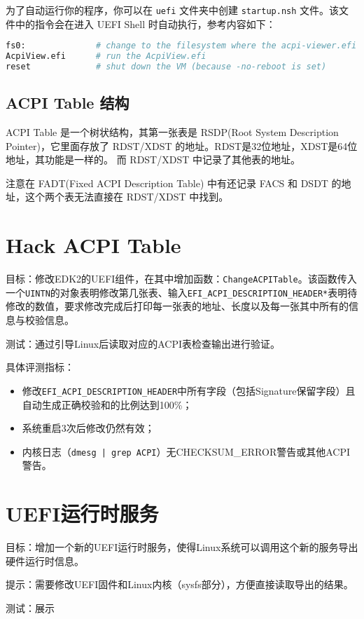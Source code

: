 为了自动运行你的程序，你可以在 \texttt{uefi} 文件夹中创建 \texttt{startup.nsh} 文件。该文件中的指令会在进入 UEFI Shell 时自动执行，参考内容如下：

\begin{lstlisting}[language=bash]
fs0:              # change to the filesystem where the acpi-viewer.efi is located
AcpiView.efi      # run the AcpiView.efi
reset             # shut down the VM (because -no-reboot is set)
\end{lstlisting}

\subsection{ACPI Table 结构}

ACPI Table 是一个树状结构，其第一张表是 RSDP(Root System Description Pointer)，它里面存放了 RDST/XDST 的地址。RDST是32位地址，XDST是64位地址，其功能是一样的。
而 RDST/XDST 中记录了其他表的地址。

注意在 FADT(Fixed ACPI Description Table) 中有还记录 FACS 和 DSDT 的地址，这个两个表无法直接在 RDST/XDST 中找到。

\section{Hack ACPI Table}
目标：修改EDK2的UEFI组件，在其中增加函数：\texttt{ChangeACPITable}。该函数传入一个\texttt{UINTN}的对象表明修改第几张表、输入\texttt{EFI\_ACPI\_DESCRIPTION\_HEADER*}表明待修改的数值，要求修改完成后打印每一张表的地址、长度以及每一张其中所有的信息与校验信息。

测试：通过引导Linux后读取对应的ACPI表检查输出进行验证。

具体评测指标：
\begin{itemize}
\item 修改\texttt{EFI\_ACPI\_DESCRIPTION\_HEADER}中所有字段（包括Signature保留字段）且自动生成正确校验和的比例达到100\%；
\item 系统重启3次后修改仍然有效；
\item 内核日志（\texttt{dmesg | grep ACPI}）无CHECKSUM\_ERROR警告或其他ACPI警告。
\end{itemize}

\section{UEFI运行时服务}
目标：增加一个新的UEFI运行时服务，使得Linux系统可以调用这个新的服务导出硬件运行时信息。

提示：需要修改UEFI固件和Linux内核（sysfs部分），方便直接读取导出的结果。

测试：展示
